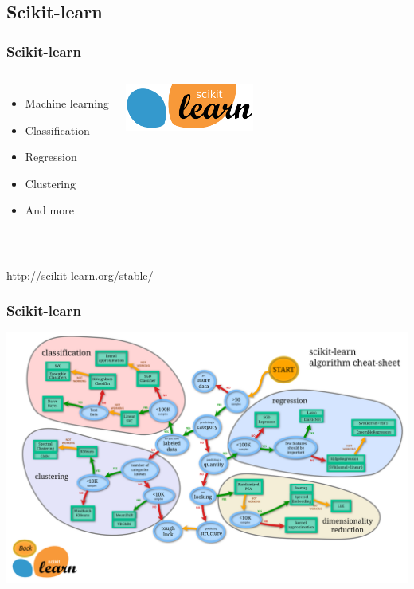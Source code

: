 \documentclass[14pt]{beamer}
\begin{document}
\subsection{Scikit-learn}
\begin{frame}
\frametitle{Scikit-learn}
\begin{columns}
\begin{itemize}
\item Machine learning
\item Classification
\item Regression
\item Clustering
\item And more
\end{itemize}
\includegraphics[width=\textwidth]{scikit-learn-logo-small.png}
\end{columns}
~\\
\url{http://scikit-learn.org/stable/}
\end{frame}

\begin{frame}
\frametitle{Scikit-learn}
\includegraphics[width=\textwidth]{ml_map.png}
\end{frame}
\end{document}

